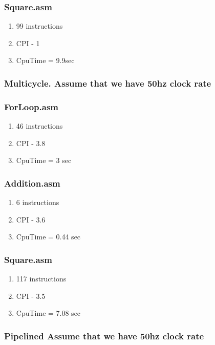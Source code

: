 \documentclass[10pt]{article}
\begin{document}
        \subsubsection{Square.asm}
        \begin{enumerate}
            \item 99 instructions
            \item CPI - 1
            \item CpuTime = 9.9sec  
        \end{enumerate}

    \subsubsection{Multicycle. Assume that we have 50hz clock rate}
        \subsubsection{ForLoop.asm}
        \begin{enumerate}
            \item 46 instructions
            \item CPI - 3.8
            \item CpuTime = 3 sec 
        \end{enumerate}
        \subsubsection{Addition.asm}
        \begin{enumerate}
            \item 6 instructions
            \item CPI - 3.6
            \item CpuTime = 0.44 sec
        \end{enumerate}
        \subsubsection{Square.asm}
        \begin{enumerate}
            \item 117 instructions
            \item CPI - 3.5
            \item CpuTime = 7.08 sec
        \end{enumerate}

    \subsubsection{Pipelined Assume that we have 50hz clock rate}
\end{document}
